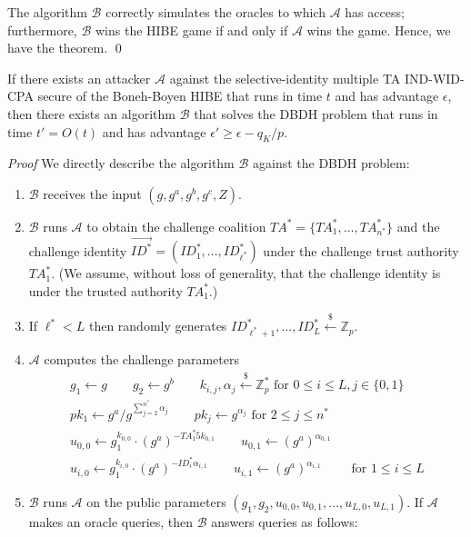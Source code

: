 \documentclass[10pt]{llncs}
\newcommand{\A}{\mathcal{A}}
\newcommand{\B}{\mathcal{B}}
\newcommand{\Zbb}{\mathbb{Z}}
\newcommand{\ID}{\mathit{ID}}
\newcommand{\TA}{\mathit{TA}}
\newcommand{\getsr}{\stackrel{{\scriptscriptstyle\$}}{\gets}}
\begin{document}
The algorithm $\B$ correctly simulates the oracles to which $\A$ has access; furthermore, $\B$ wins the HIBE game if and only if $\A$ wins the game. Hence, we have the theorem. \qed

\begin{theorem}
If there exists an attacker $\A$ against the selective-identity multiple TA IND-WID-CPA secure of the Boneh-Boyen HIBE that runs in time $t$ and has advantage $\epsilon$, then there exists an algorithm $\B$ that solves the DBDH problem that runs in time $t'=O(t)$ and has advantage $\epsilon' \geq \epsilon -q_{K}/p$.
\end{theorem}
\emph{Proof} We directly describe the algorithm $\B$ against the DBDH problem:
\begin{enumerate}
\item $\B$ receives the input $(g,g^{a},g^{b},g^{c},Z)$.
\item $\B$ runs $\A$ to obtain the challenge coalition $\TA^{*}=\{\TA^{*}_{1},\ldots,\TA^{*}_{n^{*}}\}$ and the challenge identity $\vec{\ID^{*}}=(\ID^{*}_{1},\ldots,\ID^{*}_{\ell^{*}})$ under the challenge trust authority $\TA^{*}_{1}$. (We assume, without loss of generality, that the challenge identity is under the trusted authority $\TA^{*}_{1}$.)
\item If $\ell^{*} < L$ then randomly generates $\ID^{*}_{\ell^{*}+1},\ldots,\ID^{*}_{L}\getsr \Zbb_{p}$.
\item $\A$ computes the challenge parameters
	\begin{displaymath}
	\begin{array}{c}
	g_{1} \gets g \qquad g_{2}\gets g^{b} \qquad k_{i,j}, \alpha_{j} \getsr \Zbb_{p}^{*} \mbox{ for } 0\leq i\leq L, j\in \{0,1\}\\
	pk_1 \gets g^{a}/g^{\sum_{j=2}^{n^{*}} \alpha_{j}} \qquad pk_j \gets g^{\alpha_{j}} \mbox{ for } 2\leq j\leq n^{*}\\
	u_{0,0} \gets g_{1}^{k_{0,0}}\cdot (g^{a})^{-\TA^{*}_{1}5k_{0,1}} \qquad u_{0,1} \gets (g^{a})^{\alpha_{0,1}}\\
	u_{i,0} \gets g_{1}^{k_{i,0}}\cdot (g^{a})^{-\ID^{*}_{i}\alpha_{i,1}} \qquad u_{i,1} \gets (g^{a})^{\alpha_{i,1}} \qquad \mbox{ for } 1\leq i\leq L
	\end{array}
	\end{displaymath}
\item $\B$ runs $\A$ on the public parameters $(g_{1},g_{2},u_{0,0},u_{0,1},\ldots,u_{L,0},u_{L,1})$. If $\A$ makes an oracle queries, then $\B$ answers queries as follows:
	\begin{itemize}

\end{itemize}
\end{enumerate}
\end{document}
